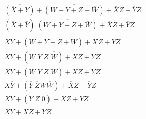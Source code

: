 \documentclass[12pt,letterpaper]{article}
\begin{document}
\begin{enumerate}
\begin{align*}
        \overline{(\overline{X}+Y)}+\overline{(W+Y+Z+\overline{W})}+\overline{X}Z+\overline{Y}Z \tag{De Morgan's} \\
        (\overline{\overline{X}}+\overline{Y})\;\overline{(W+Y+Z+\overline{W})}+\overline{X}Z+\overline{Y}Z \tag{De Morgan's} \\
        X\overline{Y}+\overline{(W+Y+Z+\overline{W})}+\overline{X}Z+\overline{Y}Z \tag{Involution} \\
        X\overline{Y}+(\overline{W}\;\overline{Y}\;\overline{Z}\;\overline{\overline{W}})+\overline{X}Z+\overline{Y}Z \tag{De Morgan's} \\
        X\overline{Y}+(\overline{W}\;\overline{Y}\;\overline{Z}\;W)+\overline{X}Z+\overline{Y}Z \tag{Involution} \\
        X\overline{Y}+(\overline{Y}\;\overline{Z}W\overline{W})+\overline{X}Z+\overline{Y}Z \tag{Commutativity} \\
        X\overline{Y}+(\overline{Y}\;\overline{Z}\;0)+\overline{X}Z+\overline{Y}Z \tag{Complementation} \\
        X\overline{Y}+\overline{X}Z+\overline{Y}Z \tag{Nilpotent} \\
      \end{align*}
  \end{enumerate}
\end{document}
